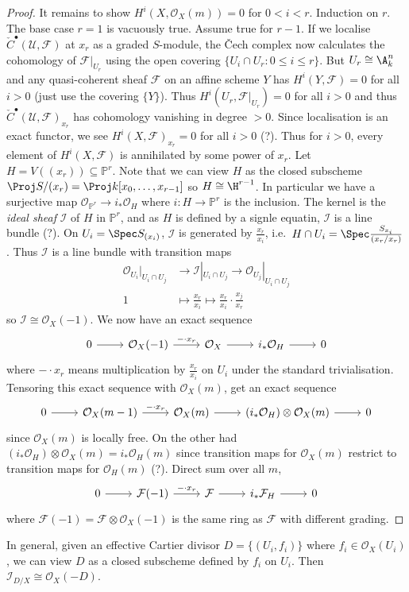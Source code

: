\documentclass[a4paper]{article}
\renewcommand*{\P}{\mathbb{P}}
\newcommand{\sh}[1]{\mathcal{#1}} %
\begin{document}
\begin{proof}
  It remains to show \(H^i(X, \sh O_X(m)) = 0\) for \(0 < i < r\). Induction on \(r\). The base case \(r = 1\) is vacuously true. Assume true for \(r - 1\). If we localise \(\check C^\bullet(\mathcal U, \sh F)\) at \(x_r\) as a graded \(S\)-module, the Čech complex now calculates the cohomology of \(\sh F|_{U_r}\) using the open covering \(\{U_i \cap U_r: 0 \leq i \leq r\}\). But \(U_r \cong \A^n_k\) and any quasi-coherent sheaf \(\sh F\) on an affine scheme \(Y\) has \(H^i(Y, \sh F) = 0\) for all \(i > 0\) (just use the covering \(\{Y\}\)). Thus \(H^i(U_r, \sh F|_{U_r}) = 0\) for all \(i > 0\) and thus \(\check C^\bullet(\mathcal U, \sh F)_{x_r}\) has cohomology vanishing in degree \(> 0\). Since localisation is an exact functor, we see \(H^i(X, \sh F)_{x_r} = 0\) for all \(i > 0\) (?). Thus for \(i > 0\), every element of \(H^i(X, \sh F)\) is annihilated by some power of \(x_r\). Let \(H = V((x_r)) \subseteq \P^r\). Note that we can view \(H\) as the closed subscheme \(\Proj S/(x_r) = \Proj k[x_0, \dots, x_{r - 1}]\) so \(H \cong \H^{r - 1}\). In particular we have a surjective map \(\sh O_{\P^r} \to i_* \sh O_H\) where \(i: H \to \P^r\) is the inclusion. The kernel is the \emph{ideal sheaf} \(\sh I\) of \(H\) in \(\P^r\), and as \(H\) is defined by a signle equatin, \(\sh I\) is a line bundle (?). On \(U_i = \Spec S_{(x_i)}\), \(\sh I\) is generated by \(\frac{x_r}{x_i}\), i.e.\ \(H \cap U_i = \Spec \frac{S_{x_i}}{(x_r/x_r)}\). Thus \(\sh I\) is a line bundle with transition maps
  \begin{align*}
    \sh O_{U_i}|_{U_i \cap U_j} &\to \sh I|_{U_i \cap U_j} \to \sh O_{U_j}|_{U_i \cap U_j} \\
    1 &\mapsto \frac{x_r}{x_i} \mapsto \frac{x_r}{x_i} \cdot \frac{x_j}{x_r}
  \end{align*}
  so \(\sh I \cong \sh O_X(-1)\). We now have an exact sequence
  \[
    \begin{tikzcd}
      0 \ar[r] & \sh O_X(-1) \ar[r, "- \cdot x_r"] & \sh O_X \ar[r] & i_* \sh O_H \ar[r] & 0
    \end{tikzcd}
  \]
  where \(- \cdot x_r\) means multiplication by \(\frac{x_r}{x_i}\) on \(U_i\) under the standard trivialisation. Tensoring this exact sequence with \(\sh O_X(m)\), get an exact sequence
  \[
    \begin{tikzcd}
      0 \ar[r] & \sh O_X(m - 1) \ar[r, "- \cdot x_r"] & \sh O_X(m) \ar[r] & (i_* \sh O_H) \otimes \sh O_X(m) \ar[r] & 0
    \end{tikzcd}
  \]
  since \(\sh O_X(m)\) is locally free. On the other had \((i_* \sh O_H) \otimes \sh O_X(m) = i_* \sh O_H(m)\) since transition maps for \(\sh O_X(m)\) restrict to transition maps for \(\sh O_H(m)\) (?). Direct sum over all \(m\),
  \[
    \begin{tikzcd}
      0 \ar[r] & \sh F(-1) \ar[r, "-\cdot x_r"] & \sh F \ar[r] & i_* \sh F_H \ar[r] & 0
    \end{tikzcd}
  \]
  where \(\sh F(-1) = \sh F \otimes \sh O_X(-1)\) is the same ring as \(\sh F\) with different grading.
\end{proof}

\begin{remark}
  In general, given an effective Cartier divisor \(D = \{(U_i, f_i)\}\) where \(f_i \in \sh O_X(U_i)\), we can view \(D\) as a closed subscheme defined by \(f_i\) on \(U_i\). Then \(\sh I_{D/X} \cong \sh O_X(-D)\).
\end{remark}




\printindex
\end{document}
